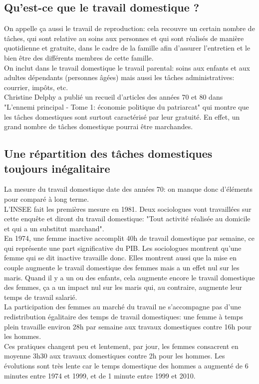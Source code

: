 \documentclass[12pt, a4paper, openany]{book}
\begin{document}
\subsection{Qu'est-ce que le travail domestique ?}

On appelle ça aussi le travail de reproduction: cela recouvre un certain nombre de tâches, qui sont relative au soins aux personnes et qui sont réalisés de manière quotidienne et gratuite, dans le cadre de la famille afin d'assurer l'entretien et le bien être des différents membres de cette famille. \\
On inclut dans le travail domestique le travail parental: soins aux enfants et aux adultes dépendants (personnes âgées) mais aussi les tâches administratives: courrier, impôts, etc. \\
Christine Delphy a publié un recueil d'articles des années 70 et 80 dans "L'ennemi principal - Tome 1: économie politique du patriarcat" qui montre que les tâches domestiques sont surtout caractérisé par leur gratuité. En effet, un grand nombre de tâches domestique pourrai être marchandes.


\subsection{Une répartition des tâches domestiques toujours inégalitaire}

La mesure du travail domestique date des années 70: on manque donc d'éléments pour comparé à long terme. \\
L'INSEE fait les premières mesure en 1981. Deux sociologues vont travaillées sur cette enquête et diront du travail domestique: "Tout activité réalisée au domicile et qui a un substitut marchand".  \\
En 1974, une femme inactive accomplit 40h de travail domestique par semaine, ce qui représente une part significative du PIB. Les sociologues montrent qu'une femme qui se dit inactive travaille donc. Elles montrent aussi que la mise en couple augmente le travail domestique des femmes mais a un effet nul sur les maris. Quand il y a un ou des enfants, cela augmente encore le travail domestique des femmes, ça a un impact nul sur les maris qui, au contraire, augmente leur temps de travail salarié. \\
La participation des femmes au marché du travail ne s'accompagne pas d'une redistribution égalitaire des temps de travail domestiques: une femme à temps plein travaille environ 28h par semaine aux travaux domestiques contre 16h pour les hommes. \\
Ces pratiques changent peu et lentement, par jour, les femmes consacrent en moyenne 3h30 aux travaux domestiques contre 2h pour les hommes. Les évolutions sont très lente car le temps domestique des hommes a augmenté de 6 minutes entre 1974 et 1999, et de 1 minute entre 1999 et 2010. 
\end{document}
